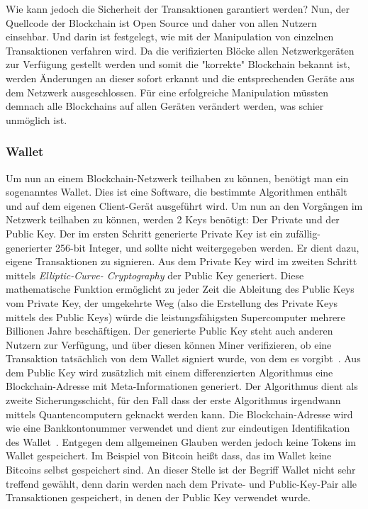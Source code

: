 Wie kann jedoch die Sicherheit der Transaktionen garantiert werden? Nun, der Quellcode der Blockchain ist Open Source und daher von allen Nutzern einsehbar. Und darin ist festgelegt, wie mit der Manipulation von einzelnen Transaktionen verfahren wird. Da die verifizierten Blöcke allen Netzwerkgeräten zur Verfügung gestellt werden und somit die "korrekte" Blockchain bekannt ist, werden Änderungen an dieser sofort erkannt und die entsprechenden Geräte aus dem Netzwerk ausgeschlossen. Für eine erfolgreiche Manipulation müssten demnach alle Blockchains auf allen Geräten verändert werden, was schier unmöglich ist.


\subsubsection{Wallet}

Um nun an einem Blockchain-Netzwerk teilhaben zu können, benötigt man ein sogenanntes Wallet. Dies ist eine Software, die bestimmte Algorithmen enthält und auf dem eigenen Client-Gerät ausgeführt wird. 
Um nun an den Vorgängen im Netzwerk teilhaben zu können, werden 2 Keys benötigt: Der Private und der Public Key. 
Der im ersten Schritt generierte Private Key ist ein zufällig-generierter 256-bit Integer, und sollte nicht weitergegeben werden. Er dient dazu, eigene Transaktionen zu signieren. Aus dem Private Key wird im zweiten Schritt mittels \textit{Elliptic-Curve- Cryptography} der Public Key generiert. Diese mathematische Funktion ermöglicht zu jeder Zeit die Ableitung des Public Keys vom Private Key, der umgekehrte Weg (also die Erstellung des Private Keys mittels des Public Keys) würde die leistungsfähigsten Supercomputer mehrere Billionen Jahre beschäftigen. Der generierte Public Key steht auch anderen Nutzern zur Verfügung, und über diesen können Miner verifizieren, ob eine Transaktion tatsächlich von dem Wallet signiert wurde, von dem es vorgibt~\cite[S. 41]{Voshmgir.2019}. 
Aus dem Public Key wird zusätzlich mit einem differenzierten Algorithmus eine Blockchain-Adresse mit Meta-Informationen generiert. Der Algorithmus dient als zweite Sicherungsschicht, für den Fall dass der erste Algorithmus irgendwann mittels Quantencomputern geknackt werden kann. Die Blockchain-Adresse wird wie eine Bankkontonummer verwendet und dient zur eindeutigen Identifikation des Wallet~\cite[S. 42]{Voshmgir.2019}.
Entgegen dem allgemeinen Glauben werden jedoch keine Tokens im Wallet gespeichert. Im Beispiel von Bitcoin heißt dass, das im Wallet keine Bitcoins selbst gespeichert sind. An dieser Stelle ist der Begriff Wallet nicht sehr treffend gewählt, denn darin werden nach dem Private- und Public-Key-Pair alle Transaktionen gespeichert, in denen der Public Key verwendet wurde.

